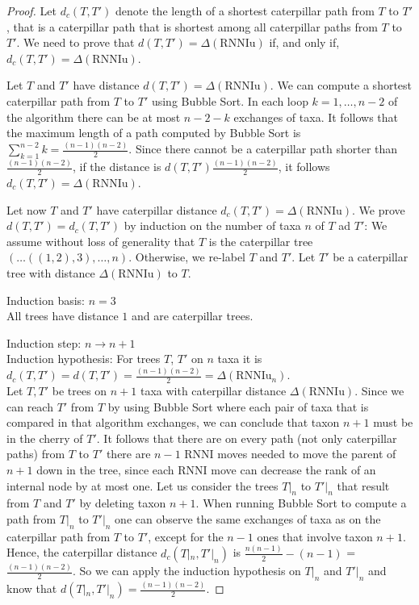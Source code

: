 \documentclass[11pt, a4paper]{article}
\newcommand{\rnni}{\mathrm{RNNI}}
\newcommand{\rnniu}{\mathrm{RNNIu}}
\begin{document}
\begin{proof}
    Let $d_c(T,T')$ denote the length of a shortest caterpillar path from $T$ to $T'$, that is a caterpillar path that is shortest among all caterpillar paths from $T$ to $T'$.
    We need to prove that $d(T,T') = \Delta(\rnniu)$ if, and only if, $d_c(T,T') = \Delta(\rnniu)$.

    Let $T$ and $T'$ have distance $d(T,T') = \Delta(\rnniu)$.
    We can compute a  shortest caterpillar path from $T$ to $T'$ using Bubble Sort.
    In each loop $k=1, \ldots, n-2$ of the algorithm there can be at most $n-2-k$ exchanges of taxa.
    It follows that the maximum length of a path computed by Bubble Sort is $\sum\limits_{k=1}^{n-2} k = \frac{(n-1)(n-2)}{2}$.
    Since there cannot be a caterpillar path shorter than $\frac{(n-1)(n-2)}{2}$, if the distance is $d(T,T') \frac{(n-1)(n-2)}{2}$, it follows $d_c(T,T') = \Delta(\rnniu)$.

    Let now $T$ and $T'$ have caterpillar distance $d_c(T,T') = \Delta(\rnniu)$.
    We prove $d(T,T') = d_c(T,T')$ by induction on the number of taxa $n$ of $T$ ad $T'$:
    We assume without loss of generality that $T$ is the caterpillar tree $(\ldots ((1,2),3), \ldots, n)$.
    Otherwise, we re-label $T$ and $T'$.
    Let $T'$ be a caterpillar tree with distance $\Delta(\rnniu)$ to $T$.

    Induction basis: $n=3$\\
    All trees have distance $1$ and are caterpillar trees.

    Induction step: $n \to n+1$\\
    Induction hypothesis: For trees $T$, $T'$ on $n$ taxa it is $d_c(T,T') = d(T, T') = \frac{(n-1)(n-2)}{2} = \Delta(\rnniu_n)$.\\
    Let $T, T'$ be trees on $n+1$ taxa with caterpillar distance $\Delta(\rnniu)$.
    Since we can reach $T'$ from $T$ by using Bubble Sort where each pair of taxa that is compared in that algorithm exchanges, we can conclude that taxon $n+1$ must be in the cherry of $T'$.
    It follows that there are on every path (not only caterpillar paths) from $T$ to $T'$ there are $n-1$ $\rnni$ moves needed to move the parent of $n+1$ down in the tree, since each $\rnni$ move can decrease the rank of an internal node by at most one.
    Let us consider the trees $T|_n$ to $T'|_n$ that result from $T$ and $T'$ by deleting taxon $n+1$.
    When running Bubble Sort to compute a path from $T|_n$ to $T'|_n$ one can observe the same exchanges of taxa as on the caterpillar path from $T$ to $T'$, except for the $n-1$ ones that involve taxon $n+1$.
    Hence, the caterpillar distance $d_c(T|_n, T'|_n)$ is $\frac{n(n-1)}{2} - (n-1)$ = $\frac{(n-1)(n-2)}{2}$.
    So we can apply the induction hypothesis on $T|_n$ and $T'|_n$ and know that $d(T|_n,T'|_n) = \frac{(n-1)(n-2)}{2}$.


\end{proof}
\end{document}
